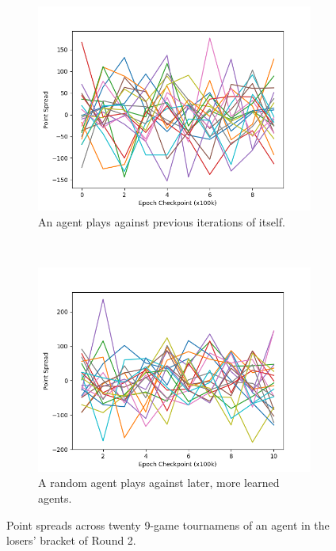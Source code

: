 
\begin{figure}
\center

\begin{subfigure}[b]{0.45\textwidth}
	\includegraphics[width=\linewidth]{images/findings/round2/spreads_self-v-prev_loser.png}
	\caption{An agent plays against previous iterations of itself.}
	\label{fig:r2-spreads-loser-a}
\end{subfigure}
~
\begin{subfigure}[b]{0.45\textwidth}
	\includegraphics[width=\linewidth]{images/findings/round2/spreads_rand-v-fut_loser.png}
	\caption{A random agent plays against later, more learned agents.}
	\label{fig:r2-spreads-loser-b}
\end{subfigure}

\caption{
	Point spreads across twenty 9-game tournamens of an agent in the
	losers' bracket of Round 2.
}
\label{fig:r2-spreads-loser}
\end{figure}
